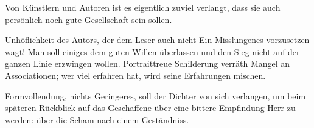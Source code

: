 Von Künstlern und Autoren ist es eigentlich zuviel verlangt, dass sie auch persönlich noch gute Gesellschaft sein sollen.
\par

Unhöflichkeit des Autors, der dem Leser auch nicht Ein Misslungenes vorzusetzen wagt! Man soll einiges dem guten Willen überlassen und den Sieg nicht auf der ganzen Linie erzwingen wollen. Portraittreue Schilderung verräth Mangel an Associationen; wer viel erfahren hat, wird seine Erfahrungen mischen.
\par

Formvollendung, nichts Geringeres, soll der Dichter von sich verlangen, um beim späteren Rückblick auf das Geschaffene über eine bittere Empfindung Herr zu werden: über die Scham nach einem Geständniss.
\par

